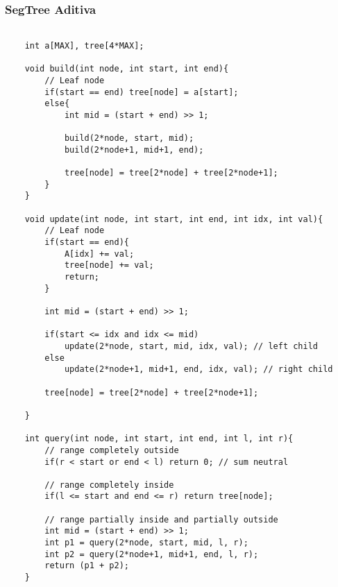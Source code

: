 \subsubsection{SegTree Aditiva}
\begin{verbatim}

    int a[MAX], tree[4*MAX];

    void build(int node, int start, int end){
        // Leaf node
        if(start == end) tree[node] = a[start];        
        else{
            int mid = (start + end) >> 1;
            
            build(2*node, start, mid);
            build(2*node+1, mid+1, end);
            
            tree[node] = tree[2*node] + tree[2*node+1];
        }
    }
    
    void update(int node, int start, int end, int idx, int val){
        // Leaf node
        if(start == end){
            A[idx] += val;
            tree[node] += val;
            return;
        }
    
        int mid = (start + end) >> 1;
        
        if(start <= idx and idx <= mid) 
            update(2*node, start, mid, idx, val); // left child
        else 
            update(2*node+1, mid+1, end, idx, val); // right child
        
        tree[node] = tree[2*node] + tree[2*node+1];
        
    }

    int query(int node, int start, int end, int l, int r){
        // range completely outside
        if(r < start or end < l) return 0; // sum neutral

        // range completely inside
        if(l <= start and end <= r) return tree[node];
        
        // range partially inside and partially outside
        int mid = (start + end) >> 1;
        int p1 = query(2*node, start, mid, l, r);
        int p2 = query(2*node+1, mid+1, end, l, r);
        return (p1 + p2);
    }
\end{verbatim}


